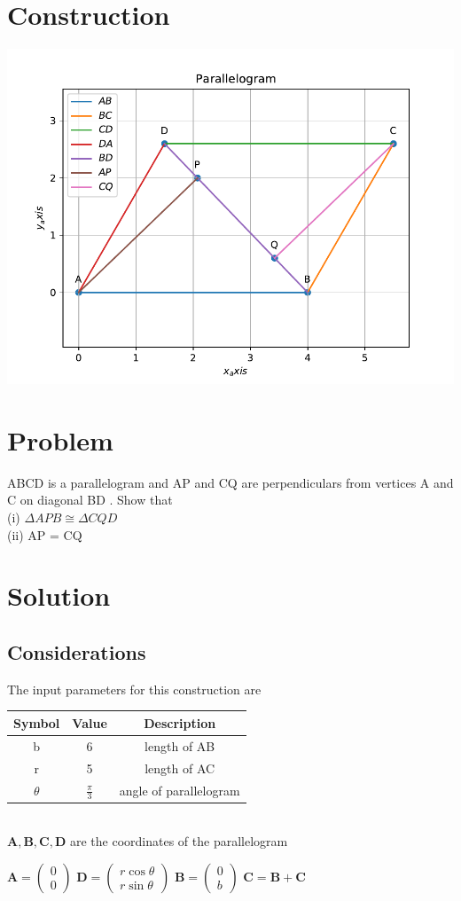 \documentclass[10pt, a4paper]{article}
\title{\mytitle}
\author{\myauthor\hspace{1em}\\\contact\\FWC22012\hspace{6.5em}IITH\hspace{0.5em}\mymodule\hspace{6em}ASSIGN-5}
\date{}
\newcommand{\myvec}[1]{\ensuremath{\begin{pmatrix}#1\end{pmatrix}}}
\let\vec\mathbf
\begin{document}
	\maketitle
	\tableofcontents

	\section{Construction}
\includegraphics[scale=0.5]{matrixline.pdf}
   \section{Problem}
  ABCD is a parallelogram and AP and CQ are
perpendiculars from vertices A and C on diagonal
BD . Show that \\
(i) $\Delta APB \cong \Delta CQD$  \\       
(ii) AP = CQ

   \section{Solution}
\subsection{Considerations}
The input parameters for this construction are 
\begin{center}
\begin{tabular}{|c|c|c|}
	\hline
	\textbf{Symbol}&\textbf{Value}&\textbf{Description}\\
	\hline
	b&6&length of AB\\
	\hline
	r&5&length of AC\\
	\hline
	$\theta$&$\frac{\pi}{3}$&angle of parallelogram\\
	\hline
\end{tabular}\\
$\vec{A},\vec{B},\vec{C},\vec{D}$ are the coordinates of the parallelogram
\begin{center}
$\vec{A}=\myvec{0\\0}$
$\vec{D}=\myvec{r\cos\theta \\ r\sin\theta}$
$\vec{B}=\myvec{0\\b}$
$\vec{C} = \vec{B}+\vec{C}$
\end{center}
\end{center}
\end{document}
